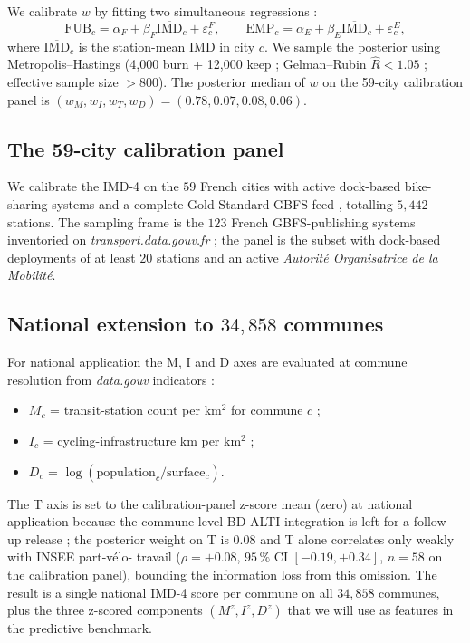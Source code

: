 \documentclass[11pt,a4paper]{article}
\newcommand{\IMD}{\mathrm{IMD}}
\begin{document}
We calibrate $w$ by fitting two simultaneous regressions :
\[
    \text{FUB}_c = \alpha_F + \beta_F \overline{\IMD}_c + \varepsilon^F_c,
    \qquad
    \text{EMP}_c = \alpha_E + \beta_E \overline{\IMD}_c + \varepsilon^E_c,
\]
where $\overline{\IMD}_c$ is the station-mean IMD in city $c$.
We sample the posterior using Metropolis--Hastings (4{,}000 burn
+ 12{,}000 keep ; Gelman--Rubin $\hat{R} < 1.05$ ; effective
sample size $> 800$).  The posterior median of $w$ on the
59-city calibration panel is
$(w_M, w_I, w_T, w_D) = (0.78, 0.07, 0.08, 0.06)$.

\subsection{The 59-city calibration panel}
\label{sec:calib}

We calibrate the IMD-4 on the $59$ French cities with active
dock-based bike-sharing systems and a complete Gold Standard
GBFS feed \citep{Fosse2026gold}, totalling $5{,}442$ stations.
The sampling frame is the $123$ French GBFS-publishing systems
inventoried on \emph{transport.data.gouv.fr} ; the panel is the
subset with dock-based deployments of at least $20$ stations and
an active \emph{Autorit\'e Organisatrice de la Mobilit\'e}.

\subsection{National extension to $34{,}858$ communes}
\label{sec:national-imd}

For national application the M, I and D axes are evaluated at
commune resolution from \emph{data.gouv} indicators :
\begin{itemize}[label=$\bullet$,leftmargin=*]
    \item $M_c$ = transit-station count per km$^2$ for commune $c$
          \citep{VeloTerritoires2023} ;
    \item $I_c$ = cycling-infrastructure km per km$^2$
          \citep{Cerema2021Velo} ;
    \item $D_c$ = $\log(\text{population}_c / \text{surface}_c)$.
\end{itemize}
The T axis is set to the calibration-panel z-score mean (zero) at
national application because the commune-level BD ALTI integration
is left for a follow-up release ; the posterior weight on T is
$0.08$ and T alone correlates only weakly with INSEE part-v\'elo-
travail ($\rho = +0.08$, $95\,\%$ CI $[-0.19, +0.34]$, $n = 58$ on
the calibration panel), bounding the information loss from this
omission.  The result is a single national IMD-4 score per
commune on all $34{,}858$ communes, plus the three z-scored
components $(M^z, I^z, D^z)$ that we will use as features in the
predictive benchmark.
\end{document}
